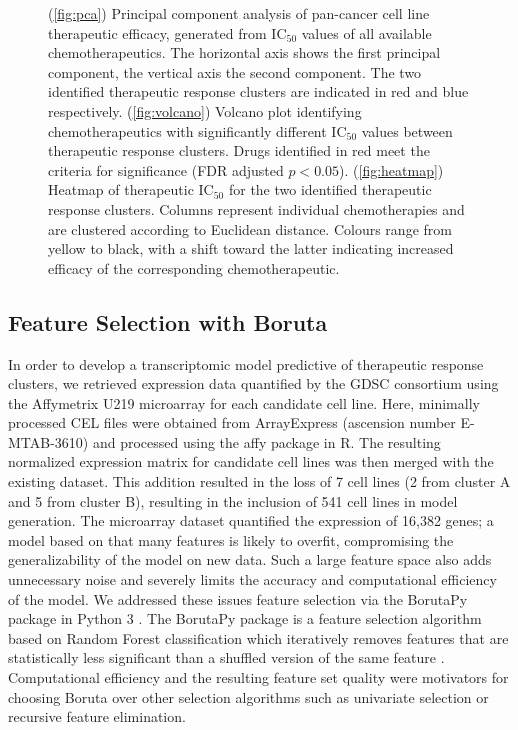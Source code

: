 \documentclass[10pt, letterpaper]{article}
\begin{document}
\begin{multicols*}{2}
\begin{figure}[!ht]
    \caption{(\ref{fig:pca}) Principal component analysis of pan-cancer cell line therapeutic efficacy, generated from IC$_{50}$ values of all available chemotherapeutics. The horizontal axis shows the first principal component, the vertical axis the second component. The two identified therapeutic response clusters are indicated in red and blue respectively. (\ref{fig:volcano}) Volcano plot identifying chemotherapeutics with significantly different IC$_{50}$ values between therapeutic response clusters. Drugs identified in red meet the criteria for significance (FDR adjusted $p<0.05$). (\ref{fig:heatmap}) Heatmap of therapeutic IC$_{50}$ for the two identified therapeutic response clusters. Columns represent individual chemotherapies and are clustered according to Euclidean distance. Colours range from yellow to black, with a shift toward the latter indicating increased efficacy of the corresponding chemotherapeutic.}
    \label{fig:clustering}
\end{figure}


\subsection{Feature Selection with Boruta}
In order to develop a transcriptomic model predictive of therapeutic response clusters, we retrieved expression data quantified by the GDSC consortium using the Affymetrix U219 microarray for each candidate cell line. Here, minimally processed CEL files were obtained from ArrayExpress (ascension number E-MTAB-3610) and processed using the affy package in R. The resulting normalized expression matrix for candidate cell lines was then merged with the existing dataset. This addition resulted in the loss of 7 cell lines (2 from cluster A and 5 from cluster B), resulting in the inclusion of 541 cell lines in model generation. The microarray dataset quantified the expression of 16,382 genes; a model based on that many features is likely to overfit, compromising the generalizability of the model on new data. Such a large feature space also adds unnecessary noise and severely limits the accuracy and computational efficiency of the model. We addressed these issues feature selection via the BorutaPy package in Python 3  \cite{liu}. The BorutaPy package is a feature selection algorithm based on Random Forest classification which iteratively removes features that are statistically less significant than a shuffled version of the same feature \cite{kursa}. Computational efficiency and the resulting feature set quality were motivators for choosing Boruta over other selection algorithms such as univariate selection or recursive feature elimination.



\end{multicols*}
\end{document}
